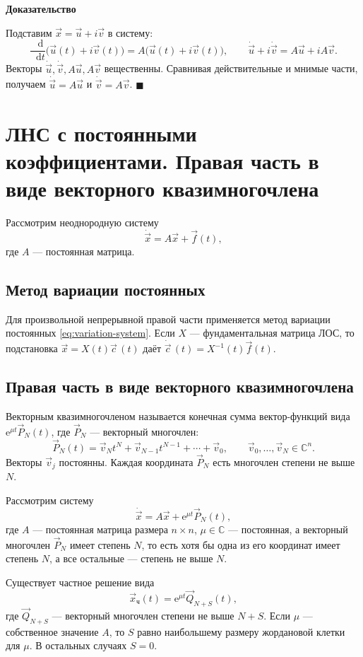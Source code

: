 \documentclass[12pt,a4paper]{article}
\numberwithin{equation}{section}
\newcommand{\vect}[1]{\vec{#1}}
\newcommand{\e}{\mathrm{e}}
\newcommand{\dd}{\mathop{}\!\mathrm{d}}
\renewenvironment{proof}[1][Доказательство]{\begin{center}\textbf{#1}\end{center}}{\hfill$\blacksquare$\par}
\DeclareRobustCommand{\examtag}[1]{\space{\normalfont\small\color{HSEgray}(#1)}}
\begin{document}
\begin{proof}
Подставим \(\vect x=\vect u+i\vect v\) в систему:
\[
 \frac{\dd}{\dd t}\bigl(\vect u(t)+i\vect v(t)\bigr)
 =A\bigl(\vect u(t)+i\vect v(t)\bigr),\qquad
 \dot{\vect u}+i\dot{\vect v}=A\vect u+iA\vect v.
\]
Векторы \(\dot{\vect u},\dot{\vect v},A\vect u,A\vect v\) вещественны.
Сравнивая действительные и мнимые части, получаем
\(\dot{\vect u}=A\vect u\) и \(\dot{\vect v}=A\vect v\).
\end{proof}

\section[ЛНС с постоянными коэффициентами\examtag{вопрос~24}]{ЛНС с постоянными коэффициентами. Правая часть в виде векторного квазимногочлена\examtag{вопрос~24}}
Рассмотрим неоднородную систему
\[
 \dot{\vect x}=A\vect x+\vect{f}(t),
\]
где \(A\) --- постоянная матрица.

\subsection{Метод вариации постоянных}
Для произвольной непрерывной правой части применяется метод вариации
постоянных \eqref{eq:variation-system}. Если \(X\) --- фундаментальная матрица
ЛОС, то подстановка \(\vect x=X(t)\vect c\,(t)\) даёт
\(\dot{\vect c}\,(t)=X^{-1}(t)\vect{f}(t)\).

\subsection{Правая часть в виде векторного квазимногочлена}
Векторным квазимногочленом называется конечная сумма вектор-функций вида
\(\e^{\mu t}\vect P_N(t)\), где \(\vect P_N\) --- векторный многочлен:
\[
 \vect P_N(t)=\vect v_N t^N+\vect v_{N-1}t^{N-1}+\cdots+\vect v_0,
 \qquad \vect v_0,\ldots,\vect v_N\in\mathbb C^n.
\]
Векторы \(\vect v_j\) постоянны. Каждая координата \(\vect P_N\) есть
многочлен степени не выше \(N\).

\begin{theoremHSE}
Рассмотрим систему
\begin{equation}
 \dot{\vect x}=A\vect x+\e^{\mu t}\vect P_N(t),
 \label{eq:lns-vector-quasipolynomial}
\end{equation}
где \(A\) --- постоянная матрица размера \(n\times n\),
\(\mu\in\mathbb C\) --- постоянная, а векторный многочлен
\(\vect P_N\) имеет степень \(N\), то есть хотя бы одна из его координат
имеет степень \(N\), а все остальные --- степень не выше \(N\).

Существует частное решение вида
\[
 \vect x_{\text{ч}}(t)=\e^{\mu t}\vect Q_{N+S}(t),
\]
где \(\vect Q_{N+S}\) --- векторный многочлен степени не выше \(N+S\).
Если \(\mu\) --- собственное значение \(A\), то \(S\) равно наибольшему
размеру жордановой клетки для \(\mu\). В остальных случаях \(S=0\).
\end{theoremHSE}
\end{document}
